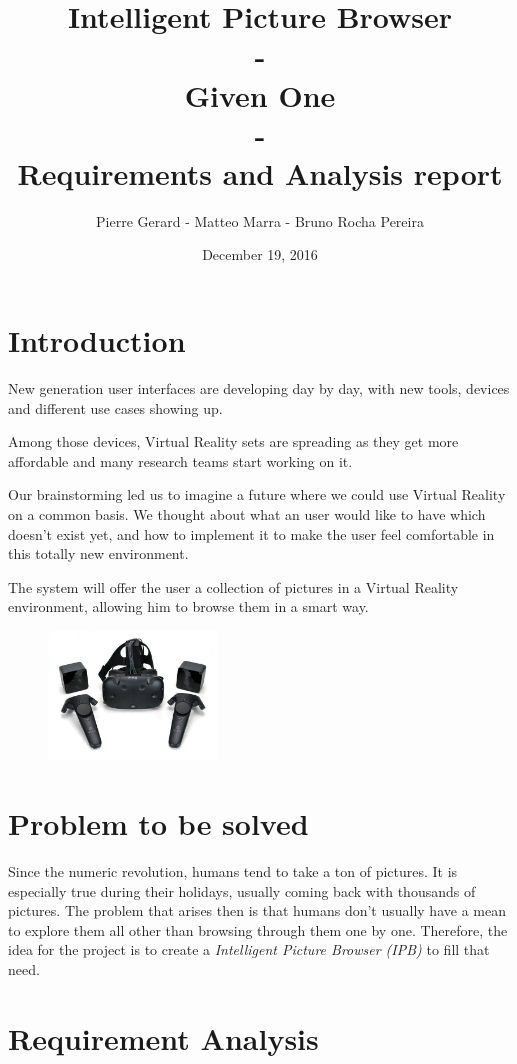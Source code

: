 \documentclass[11pt,a4paper]{article}
\author{Pierre Gerard - Matteo Marra - Bruno Rocha Pereira}
\title{Intelligent Picture Browser \\ - \\Given One \\  - \\Requirements and Analysis report}
\date{December 19, 2016}
\begin{document}
\maketitle

\section{Introduction}

New generation user interfaces are developing day by day, with new tools, devices and different use cases showing up.

Among those devices, Virtual Reality sets are spreading as they get more affordable and many research teams start working on it. 

Our brainstorming led us to imagine a future where we could use Virtual Reality on a common basis. We thought about what an user would like to have which doesn't exist yet, and how to implement it to make the user feel comfortable in this totally new environment.

The system will offer the user a collection of pictures in a Virtual Reality environment, allowing him to browse them in a smart way.

\begin{figure}[H]
  \label{fig:vive}
  \centering
  \includegraphics[width=0.4\textwidth]{img/vive.jpg}
\end{figure}

\section{Problem to be solved}

Since the numeric revolution, humans tend to take a ton of pictures. It is especially true during their holidays, usually coming back with thousands of pictures. The problem that arises then is that humans don't usually have a mean to explore them all other than browsing through them one by one. Therefore, the idea for the project is to create a \textit{Intelligent Picture Browser (IPB)} to fill that need.

\section{Requirement Analysis} \label{requi}
\end{document}
